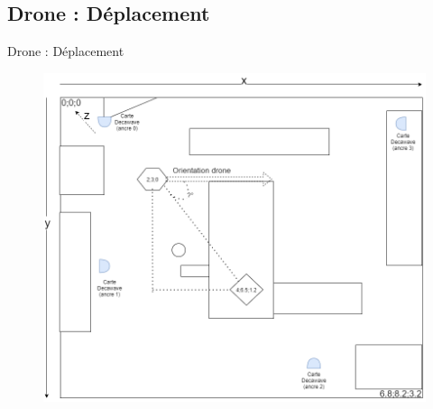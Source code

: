         \subsection{Drone : Déplacement}
            \begin{frame}[allowframebreaks]{Drone : Déplacement}
                \begin{figure}[H]
        			\centering
        			\includegraphics[width=0.67\linewidth]{images/methodologie.png}
        		\end{figure}
        		

\end{frame}
